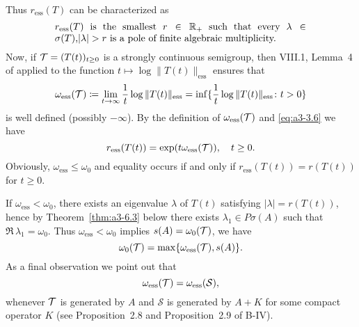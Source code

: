 \begin{example}
Thus $r_{\text{ess}}(T)$ can be characterized as
\begin{equation}\label{eq:a3-3.8}
\begin{minipage}{.75\textwidth}
$r_{\text{ess}}(T) $ is the smallest   $r \in \R_{+}$    such that every   
$\lambda \in \sigma(T)$,$ |\lambda| > r $  is a pole of finite algebraic multiplicity. 
\end{minipage}
\end{equation}
Now, if $\mathcal{T} = (T(t))_{t \geq 0}$ is a strongly continuous semigroup, then VIII.1, Lemma~4 of \citet{dunfordschwartz:1958} applied to the function $t \mapsto \log \|T(t)\|_{\text{ess}}$ ensures that
\begin{equation}\label{eq:a3-3.9}
\omega_{\text{ess}}(\mathcal{T}) \coloneqq \lim_{t \to \infty} \frac{1}{t} \log\|T(t)\|_{\text{ess}} = \inf \{\frac{1}{t} \log\|T(t)\|_{\text{ess}} \colon t > 0\}
\end{equation}
is well defined (possibly $-\infty$).
By the definition of $\omega_{\text{ess}}(\mathcal{T})$ and \eqref{eq:a3-3.6} we have
\begin{equation}\label{eq:a3-3.10}
r_{\text{ess}}(T(t)) = \exp(t\omega_{\text{ess}}(\mathcal{T})), \quad t \geq 0 .
\end{equation}
Obviously, $\omega_{\text{ess}} \leq \omega_{0}$ and equality occurs if and only if $r_{\text{ess}}(T(t)) = r(T(t))$ for $t \geq 0$.

If $\omega_{\text{ess}} < \omega_{0}$, there exists an eigenvalue $\lambda$ of $T(t)$ satisfying $|\lambda| = r(T(t))$, hence by Theorem~\ref{thm:a3-6.3} below there exists $\lambda_{1} \in P\sigma(A)$ such that $\Re\,\lambda_{1} = \omega_{0}$.
Thus $\omega_{\text{ess}} < \omega_{0}$ implies $s(A) = \omega_{0}(\mathcal{T})$, \ie we have
\begin{equation}\label{eq:a3-3.11}
\omega_{0}(\mathcal{T}) = \max\{\omega_{\text{ess}}(\mathcal{T}),s(A)\} .
\end{equation}
As a final observation we point out that
\begin{equation}\label{eq:a3-3.12}
\omega_{\text{ess}}(\mathcal{T}) = \omega_{\text{ess}}({\mathcal{S}}) ,
\end{equation}
whenever $\mathcal{T}$ is generated by $A$ and $\mathcal{S}$ is generated by $A + K$ for some compact operator $K$ 
(see Proposition~2.8  and Proposition~2.9 of B-IV).
\end{example}

